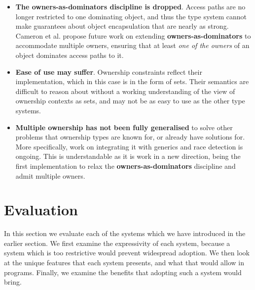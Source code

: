 \documentclass{acm_proc_article-sp}
\begin{document}
\begin{itemize}

	\item \textbf{The owners-as-dominators discipline is dropped}. Access paths
		are no longer restricted to one dominating object, and thus the type
		system cannot make guarantees about object encapsulation that are nearly
		as strong. Cameron et al. propose future work \cite{cameron07mojo} on
		extending \textbf{owners-as-dominators} to accommodate multiple owners,
		ensuring that at least \textit{one of the owners} of an object dominates
		access paths to it.

	\item \textbf{Ease of use may suffer}. Ownership constraints reflect their
		implementation, which in this case is in the form of sets. Their
		semantics are difficult to reason about without a working understanding
		of the view of ownership contexts as sets, and may not be as easy to use
		as the other type systems.

	\item \textbf{Multiple ownership has not been fully generalised} to solve
		other problems that ownership types are known for, or already have
		solutions for. More specifically, work on integrating it with generics
		and race detection is ongoing. This is understandable as it is work in
		a new direction, being the first implementation to relax the
		\textbf{owners-as-dominators} discipline and admit multiple owners.

\end{itemize}

\section{Evaluation}
\label{sec:eval}

In this section we evaluate each of the systems which we have introduced in the
earlier section. We first examine the expressivity of each system, because a
system which is too restrictive would prevent widespread adoption. We then look
at the unique features that each system presents, and what that would allow in
programs. Finally, we examine the benefits that adopting such a system would
bring.
\end{document}
